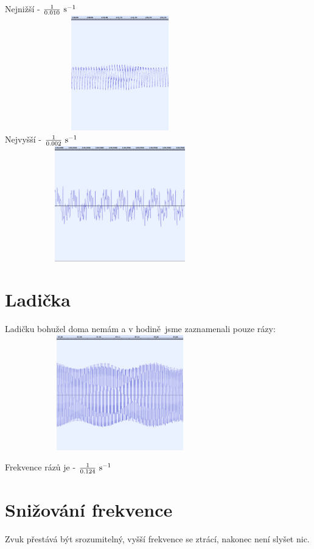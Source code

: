 \documentclass[12pt,a4paper]{article}
\begin{document}
Nejnižší - $\frac{1}{0.010}\ {\rm s^{-1}}$\\
\includegraphics[height=5cm,width=10cm]{min.png}\\
Nejvyšší - $\frac{1}{0.002}\ {\rm s^{-1}}$\\
\includegraphics[height=5cm,width=10cm]{max.png}

\newpage
\section{Ladička}
Ladičku bohužel doma nemám a v hodině jsme zaznamenali pouze rázy:\\
\includegraphics[height=5cm,width=10cm]{ladicka.png}

Frekvence rázů je - $\frac{1}{0.124}\ {\rm s^{-1}}$
\section{Snižování frekvence}
Zvuk přestává být srozumitelný, vyšší frekvence se ztrácí, nakonec není slyšet nic.
\end{document}
